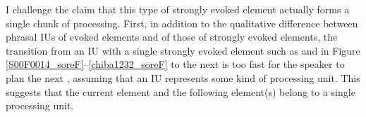 
I challenge the claim that this type of strongly evoked element actually forms a single chunk of processing.
First,
in addition to the qualitative difference between phrasal IUs of evoked elements and of those of strongly evoked elements,
the transition from an IU with a single strongly evoked element such as  and  in Figure \ref{S00F0014_soreF}--\ref{chiba1232_soreF} to the next is too fast for the speaker to plan the next ,
assuming that an IU represents some kind of processing unit.
This suggests that the current element and the following element(s) belong to a single processing unit.

